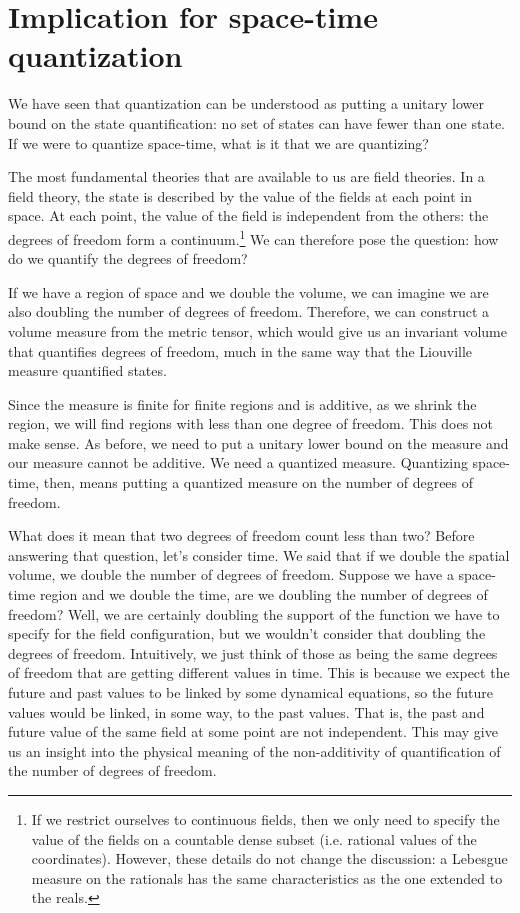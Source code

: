 \documentclass[entropy,article,submit,pdftex,moreauthors]{Definitions/mdpi}
\begin{document}
\section{Implication for space-time quantization}

We have seen that quantization can be understood as putting a unitary lower bound on the state quantification: no set of states can have fewer than one state. If we were to quantize space-time, what is it that we are quantizing?

The most fundamental theories that are available to us are field theories. In a field theory, the state is described by the value of the fields at each point in space. At each point, the value of the field is independent from the others: the degrees of freedom form a continuum.\footnote{If we restrict ourselves to continuous fields, then we only need to specify the value of the fields on a countable dense subset (i.e. rational values of the coordinates). However, these details do not change the discussion: a Lebesgue measure on the rationals has the same characteristics as the one extended to the reals.} We can therefore pose the question: how do we quantify the degrees of freedom?

If we have a region of space and we double the volume, we can imagine we are also doubling the number of degrees of freedom. Therefore, we can construct a volume measure from the metric tensor, which would give us an invariant volume that quantifies degrees of freedom, much in the same way that the Liouville measure quantified states.

Since the measure is finite for finite regions and is additive, as we shrink the region, we will find regions with less than one degree of freedom. This does not make sense. As before, we need to put a unitary lower bound on the measure and our measure cannot be additive. We need a quantized measure. Quantizing space-time, then, means putting a quantized measure on the number of degrees of freedom.

What does it mean that two degrees of freedom count less than two? Before answering that question, let's consider time. We said that if we double the spatial volume, we double the number of degrees of freedom. Suppose we have a space-time region and we double the time, are we doubling the number of degrees of freedom? Well, we are certainly doubling the support of the function we have to specify for the field configuration, but we wouldn't consider that doubling the degrees of freedom. Intuitively, we just think of those as being the same degrees of freedom that are getting different values in time. This is because we expect the future and past values to be linked by some dynamical equations, so the future values would be linked, in some way, to the past values. That is, the past and future value of the same field at some point are not independent. This may give us an insight into the physical meaning of the non-additivity of quantification of the number of degrees of freedom.
\end{document}

